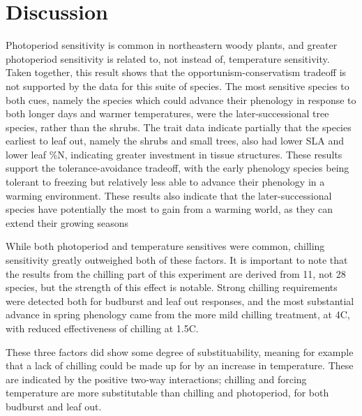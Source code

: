 \documentclass[11pt]{article}
\begin{document}


\section*{Discussion}

Photoperiod sensitivity is common in northeastern woody plants, and greater photoperiod sensitivity is related to, not instead of, temperature sensitivity. Taken together, this result shows that the opportunism-conservatism tradeoff is not supported by the data for this suite of species. The most sensitive species to both cues, namely the species which could advance their phenology in response to both longer days and warmer temperatures, were the later-successional tree species, rather than the shrubs. The trait data indicate partially that the species earliest to leaf out, namely the shrubs and small trees, also had lower SLA and lower leaf \%N, indicating greater investment in tissue structures. These results support the tolerance-avoidance tradeoff, with the early phenology species being tolerant to freezing but relatively less able to advance their phenology in a warming environment. These results also indicate that the later-successional species have potentially the most to gain from a warming world, as they can extend their growing seasons  

While both photoperiod and temperature sensitives were common, chilling sensitivity greatly outweighed both of these factors. It is important to note that the results from the chilling part of this experiment are derived from 11, not 28 species, but the strength of this effect is notable. Strong chilling requirements were detected both for budburst and leaf out responses, and the most substantial advance in spring phenology came from the more mild chilling treatment, at 4\degree C, with reduced effectiveness of chilling at 1.5\degree C. 

These three factors did show some degree of substituability, meaning for example that a lack of chilling could be made up for by an increase in temperature. These are indicated by the positive two-way interactions; chilling and forcing temperature are more substitutable than chilling and photoperiod, for both budburst and leaf out.
\end{document}
